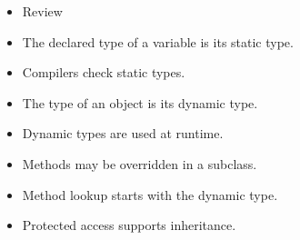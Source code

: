 \documentclass{beamer}
\begin{document}
\begin{frame}
\begin{itemize}
\item Review
\bigskip
\item The declared type of a variable is its static type.
\item Compilers check static types.
\item The type of an object is its dynamic type.
\item Dynamic types are used at runtime.
\item Methods may be overridden in a subclass.
\item Method lookup starts with the dynamic type.
\item Protected access supports inheritance.
\end{itemize}
\end{frame}
\end{document}
